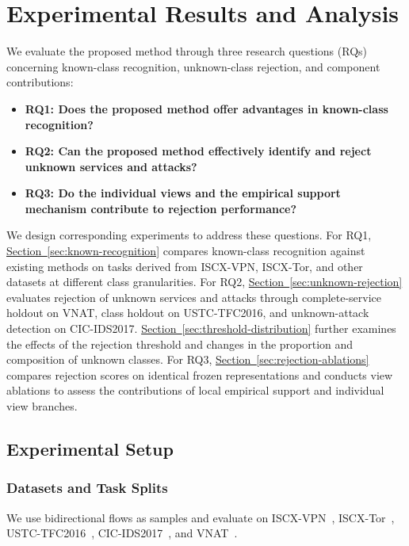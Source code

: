 \section{Experimental Results and Analysis}\label{sec:experiments}
We evaluate the proposed method through three research questions (RQs) concerning known-class recognition, unknown-class rejection, and component contributions:
\begin{itemize}
\item \textbf{RQ1: Does the proposed method offer advantages in known-class recognition?}
\item \textbf{RQ2: Can the proposed method effectively identify and reject unknown services and attacks?}
\item \textbf{RQ3: Do the individual views and the empirical support mechanism contribute to rejection performance?}
\end{itemize}
We design corresponding experiments to address these questions. For RQ1, \hyperref[sec:known-recognition]{Section~\ref*{sec:known-recognition}} compares known-class recognition against existing methods on tasks derived from ISCX-VPN, ISCX-Tor, and other datasets at different class granularities. For RQ2, \hyperref[sec:unknown-rejection]{Section~\ref*{sec:unknown-rejection}} evaluates rejection of unknown services and attacks through complete-service holdout on VNAT, class holdout on USTC-TFC2016, and unknown-attack detection on CIC-IDS2017. \hyperref[sec:threshold-distribution]{Section~\ref*{sec:threshold-distribution}} further examines the effects of the rejection threshold and changes in the proportion and composition of unknown classes. For RQ3, \hyperref[sec:rejection-ablations]{Section~\ref*{sec:rejection-ablations}} compares rejection scores on identical frozen representations and conducts view ablations to assess the contributions of local empirical support and individual view branches.

\subsection{Experimental Setup}
\subsubsection{Datasets and Task Splits}
We use bidirectional flows as samples and evaluate on ISCX-VPN~, ISCX-Tor~, USTC-TFC2016~, CIC-IDS2017~, and VNAT~.

